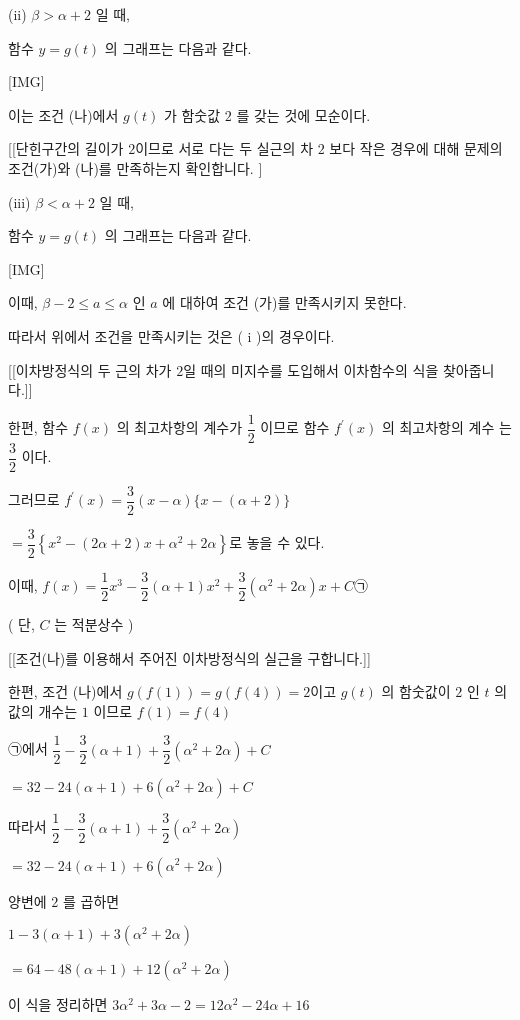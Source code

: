 \documentclass{oblivoir}
\begin{document}
(ii) $\beta>\alpha+2$ 일 때,

함수 $y=g(t)$ 의 그래프는 다음과 같다.

[IMG]

이는 조건 (나)에서 $g(t)$ 가 함숫값 $2$ 를 갖는 것에 모순이다.

[[단힌구간의 길이가 $2$이므로 서로 다는 두 실근의 차 $2$ 보다 작은  경우에 대해 문제의 조건(가)와 (나)를 만족하는지 확인합니다. ]

(iii) $\beta<  \alpha+2$ 일 때,

함수 $y=g(t)$ 의 그래프는 다음과 같다.

[IMG]

이때, $\beta-2 \leq a \leq \alpha$ 인 $a$ 에 대하여 조건 (가)를 만족시키지 못한다.

따라서 위에서 조건을 만족시키는 것은 ( i )의 경우이다.

[[이차방정식의 두 근의 차가 $2$일 때의 미지수를 도입해서 이차함수의 식을 찾아줍니다.]]

한편, 함수 $f(x)$ 의 최고차항의 계수가 $\dfrac{1}{2}$ 이므로 함수 $f^{\prime}(x)$ 의 최고차항의 계수
는 $\dfrac{3}{2}$ 이다.

그러므로
$f^{\prime}(x)=\dfrac{3}{2}(x-\alpha)\{x-(\alpha+2)\}$

$=\dfrac{3}{2}\left\{x^{2}-(2 \alpha+2) x+\alpha^{2}+2 \alpha\right\}$로 놓을 수 있다.

이때,
$f(x)=\dfrac{1}{2} x^{3}-\dfrac{3}{2}(\alpha+1) x^{2}+\dfrac{3}{2}\left(\alpha^{2}+2 \alpha\right) x+C$㉠

( 단, $C$ 는 적분상수 )

[[조건(나)를 이용해서 주어진 이차방정식의 실근을 구합니다.]]

한편, 조건 (나)에서 $g(f(1))=g(f(4))=2$이고 $g(t)$ 의 함숫값이 $2$ 인 $t$ 의 값의 개수는 $1$ 이므로
$f(1)=f(4)$

㉠에서
$\dfrac{1}{2}-\dfrac{3}{2}(\alpha+1)+\dfrac{3}{2}\left(\alpha^{2}+2 \alpha\right)+C$

$=32-24(\alpha+1)+6\left(\alpha^{2}+2 \alpha\right)+C$

따라서
$\dfrac{1}{2}-\dfrac{3}{2}(\alpha+1)+\dfrac{3}{2}\left(\alpha^{2}+2 \alpha\right)$

$=32-24(\alpha+1)+6\left(\alpha^{2}+2 \alpha\right)$

양변에 $2$ 를 곱하면

$1-3(\alpha+1)+3\left(\alpha^{2}+2 \alpha\right)$

$=64-48(\alpha+1)+12\left(\alpha^{2}+2 \alpha\right)$

이 식을 정리하면
$3 \alpha^{2}+3 \alpha-2=12 \alpha^{2}-24 \alpha+16$
\end{document}
